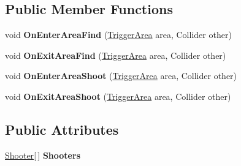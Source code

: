 \subsection*{Public Member Functions}
\begin{DoxyCompactItemize}
\item 
\hypertarget{class_skyrates_1_1_client_1_1_entity_1_1_entity_ship_navy_a7aba3d0a8208fe9bf454cfcb21e7caad}{void {\bfseries On\-Enter\-Area\-Find} (\hyperlink{class_skyrates_1_1_common_1_1_entity_1_1_trigger_area}{Trigger\-Area} area, Collider other)}\label{class_skyrates_1_1_client_1_1_entity_1_1_entity_ship_navy_a7aba3d0a8208fe9bf454cfcb21e7caad}

\item 
\hypertarget{class_skyrates_1_1_client_1_1_entity_1_1_entity_ship_navy_ad7c745eb6ae10560535a5cdff2354c14}{void {\bfseries On\-Exit\-Area\-Find} (\hyperlink{class_skyrates_1_1_common_1_1_entity_1_1_trigger_area}{Trigger\-Area} area, Collider other)}\label{class_skyrates_1_1_client_1_1_entity_1_1_entity_ship_navy_ad7c745eb6ae10560535a5cdff2354c14}

\item 
\hypertarget{class_skyrates_1_1_client_1_1_entity_1_1_entity_ship_navy_a4017a3d08a07f3f590fa545218f8ca3c}{void {\bfseries On\-Enter\-Area\-Shoot} (\hyperlink{class_skyrates_1_1_common_1_1_entity_1_1_trigger_area}{Trigger\-Area} area, Collider other)}\label{class_skyrates_1_1_client_1_1_entity_1_1_entity_ship_navy_a4017a3d08a07f3f590fa545218f8ca3c}

\item 
\hypertarget{class_skyrates_1_1_client_1_1_entity_1_1_entity_ship_navy_af2759b54f93425a74518d7d6354704ee}{void {\bfseries On\-Exit\-Area\-Shoot} (\hyperlink{class_skyrates_1_1_common_1_1_entity_1_1_trigger_area}{Trigger\-Area} area, Collider other)}\label{class_skyrates_1_1_client_1_1_entity_1_1_entity_ship_navy_af2759b54f93425a74518d7d6354704ee}

\end{DoxyCompactItemize}
\subsection*{Public Attributes}
\begin{DoxyCompactItemize}
\item 
\hypertarget{class_skyrates_1_1_client_1_1_entity_1_1_entity_ship_navy_a3e716c406054959be4eee5b259eee3df}{\hyperlink{class_skyrates_1_1_client_1_1_mono_1_1_shooter}{Shooter}\mbox{[}$\,$\mbox{]} {\bfseries Shooters}}\label{class_skyrates_1_1_client_1_1_entity_1_1_entity_ship_navy_a3e716c406054959be4eee5b259eee3df}

\end{DoxyCompactItemize}
